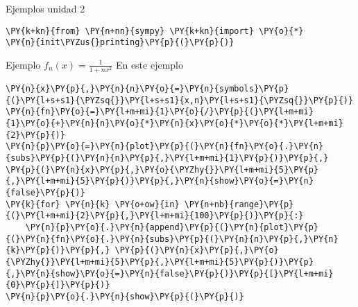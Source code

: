  Ejemplos unidad 2

    \begin{tcolorbox}[breakable, size=fbox, boxrule=1pt, pad at break*=1mm,colback=cellbackground, colframe=cellborder]
\begin{Verbatim}[commandchars=\\\{\}]
\PY{k+kn}{from} \PY{n+nn}{sympy} \PY{k+kn}{import} \PY{o}{*}
\PY{n}{init\PYZus{}printing}\PY{p}{(}\PY{p}{)}
\end{Verbatim}
\end{tcolorbox}

    Ejemplo \(f_n(x)=\frac{1}{1+nx^2}\) En este ejemplo 

    \begin{tcolorbox}[breakable, size=fbox, boxrule=1pt, pad at break*=1mm,colback=cellbackground, colframe=cellborder]
\begin{Verbatim}[commandchars=\\\{\}]
\PY{n}{x}\PY{p}{,}\PY{n}{n}\PY{o}{=}\PY{n}{symbols}\PY{p}{(}\PY{l+s+s1}{\PYZsq{}}\PY{l+s+s1}{x,n}\PY{l+s+s1}{\PYZsq{}}\PY{p}{)}
\PY{n}{fn}\PY{o}{=}\PY{l+m+mi}{1}\PY{o}{/}\PY{p}{(}\PY{l+m+mi}{1}\PY{o}{+}\PY{n}{n}\PY{o}{*}\PY{n}{x}\PY{o}{*}\PY{o}{*}\PY{l+m+mi}{2}\PY{p}{)}
\PY{n}{p}\PY{o}{=}\PY{n}{plot}\PY{p}{(}\PY{n}{fn}\PY{o}{.}\PY{n}{subs}\PY{p}{(}\PY{n}{n}\PY{p}{,}\PY{l+m+mi}{1}\PY{p}{)}\PY{p}{,} \PY{p}{(}\PY{n}{x}\PY{p}{,}\PY{o}{\PYZhy{}}\PY{l+m+mi}{5}\PY{p}{,}\PY{l+m+mi}{5}\PY{p}{)}\PY{p}{,}\PY{n}{show}\PY{o}{=}\PY{n}{false}\PY{p}{)}
\PY{k}{for} \PY{n}{k} \PY{o+ow}{in} \PY{n+nb}{range}\PY{p}{(}\PY{l+m+mi}{2}\PY{p}{,}\PY{l+m+mi}{100}\PY{p}{)}\PY{p}{:}
    \PY{n}{p}\PY{o}{.}\PY{n}{append}\PY{p}{(}\PY{n}{plot}\PY{p}{(}\PY{n}{fn}\PY{o}{.}\PY{n}{subs}\PY{p}{(}\PY{n}{n}\PY{p}{,}\PY{n}{k}\PY{p}{)}\PY{p}{,} \PY{p}{(}\PY{n}{x}\PY{p}{,}\PY{o}{\PYZhy{}}\PY{l+m+mi}{5}\PY{p}{,}\PY{l+m+mi}{5}\PY{p}{)}\PY{p}{,}\PY{n}{show}\PY{o}{=}\PY{n}{false}\PY{p}{)}\PY{p}{[}\PY{l+m+mi}{0}\PY{p}{]}\PY{p}{)}
\PY{n}{p}\PY{o}{.}\PY{n}{show}\PY{p}{(}\PY{p}{)}
\end{Verbatim}
\end{tcolorbox}

    \begin{center}
    \end{center}
    { \hspace*{\fill} \\}
    

